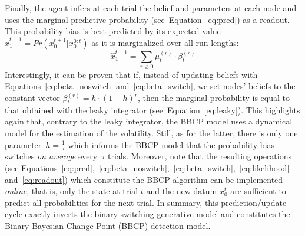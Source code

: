 \documentclass[10pt,letterpaper]{article}
\newcommand{\eql}[1]{\begin{equation}#1\end{equation}}
\DeclareMathOperator{\argmax}{argmax}
\newcommand{\seeEq}[1]{Equation~\ref{eq:#1}}
\begin{document}
Finally, the agent infers at each trial the belief and parameters at each node
and uses the marginal predictive probability (see~\seeEq{pred}) as a readout.
This probability bias is best predicted by its expected value $\hat{x}_1^{t+1}=Pr(x_0^{t+1} | x_0^{0:t})$
as it is marginalized over all run-lengths:
\eql{
\hat{x}_1^{t+1} = \sum_{r \geq 0} \mu^{(r)}_{t} \cdot \beta^{(r)}_{t}
\label{eq:readout}
}
Interestingly, it can be proven that if,
instead of updating beliefs with Equations~\ref{eq:beta_noswitch} and~\ref{eq:beta_switch},
we set nodes' beliefs to the constant vector $\beta^{(r)}_t = h \cdot (1 -h) ^r$,
then the marginal probability is equal to that obtained with the leaky integrator (see~\seeEq{leaky}).
This highlights again that, contrary to the leaky integrator, %
the BBCP model uses a dynamical model for the estimation of the volatility.
Still, as for the latter, there is only one parameter~$h=\frac 1 \tau$ which informs the BBCP model
that the probability bias switches \emph{on average} every~$\tau$ trials.
Moreover, note that the resulting operations
(see Equations~\ref{eq:pred},~\ref{eq:beta_noswitch},~\ref{eq:beta_switch},~\ref{eq:likelihood} and~\ref{eq:readout})
which constitute the BBCP algorithm
can be implemented \textit{online}, that is,
only the state at trial $t$ and the new datum $x_0^t$
are sufficient to predict all probabilities for the next trial.
In summary, this prediction/update cycle exactly inverts the binary switching generative model %
and constitutes the Binary Bayesian Change-Point (BBCP) detection model.
%
\end{document}

